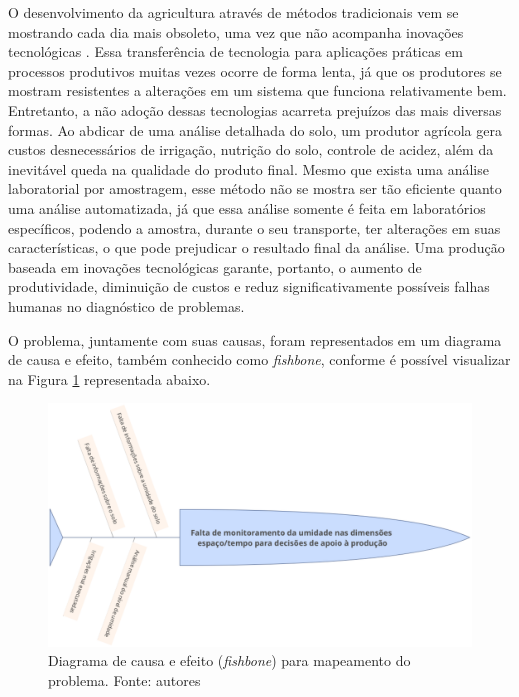   O desenvolvimento da agricultura através de métodos tradicionais vem se
  mostrando cada dia mais obsoleto, uma vez que não acompanha inovações
  tecnológicas \cite{ROCHA2015}. Essa transferência de tecnologia para aplicações
  práticas em processos produtivos muitas vezes ocorre de forma lenta, já que
  os produtores se mostram resistentes a alterações em um sistema que funciona
  relativamente bem. Entretanto, a não adoção dessas tecnologias acarreta
  prejuízos das mais diversas formas. Ao abdicar de uma análise detalhada do
  solo, um produtor agrícola gera custos desnecessários de irrigação, nutrição
  do solo, controle de acidez, além da inevitável queda na qualidade do produto
  final. Mesmo que exista uma análise laboratorial por amostragem, esse método
  não se mostra ser tão eficiente quanto uma análise automatizada, já que essa
  análise somente é feita em laboratórios específicos, podendo a amostra,
  durante o seu transporte, ter alterações em suas características, o que pode
  prejudicar o resultado final da análise. Uma produção baseada em inovações
  tecnológicas garante, portanto, o aumento de produtividade, diminuição de
  custos e reduz significativamente possíveis falhas humanas no diagnóstico de
  problemas.


  O problema, juntamente com suas causas, foram representados em um diagrama
  de causa e efeito, também conhecido como \textit{fishbone}, conforme é possível visualizar
  na Figura \ref{fig01} representada abaixo.

  \begin{figure}[h]
    \centering
    \includegraphics[keepaspectratio=true,scale=0.5]{figuras/fig01.eps}
    \caption{Diagrama de causa e efeito (\textit{fishbone}) para mapeamento do problema. Fonte: autores}
    \label{fig01}
  \end{figure}

